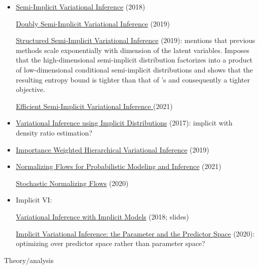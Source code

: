 \documentclass[10pt]{article}
\begin{document}
\begin{itemize}
\item
\href{https://proceedings.mlr.press/v80/yin18b/yin18b.pdf}{Semi-Implicit Variational Inference} (2018)

\href{https://proceedings.mlr.press/v89/molchanov19a/molchanov19a.pdf}{Doubly Semi-Implicit Variational Inference} (2019)

\href{https://openreview.net/pdf?id=HkxStk34Kr}{Structured Semi-Implicit Variational Inference} (2019): mentions that previous methods scale exponentially with dimension of the latent variables. Imposes that the high-dimensional semi-implicit distribution factorizes into a product of low-dimensional conditional semi-implicit distributions and shows that the resulting entropy bound is tighter than that of \sivi's and consequently a tighter \elbo objective.

\href{https://arxiv.org/pdf/2101.06070.pdf}{Efficient Semi-Implicit Variational Inference
} (2021)
\item
\href{https://arxiv.org/pdf/1702.08235.pdf}{Variational Inference using Implicit Distributions} (2017): implicit with density ratio estimation?
\item
\href{https://proceedings.neurips.cc/paper/2019/file/5737c6ec2e0716f3d8a7a5c4e0de0d9a-Paper.pdf}{Importance Weighted Hierarchical
Variational Inference} (2019)
\item
\href{https://jmlr.org/papers/volume22/19-1028/19-1028.pdf}{Normalizing Flows for Probabilistic Modeling and Inference} (2021)

\href{https://arxiv.org/pdf/2002.09547.pdf}{Stochastic Normalizing Flows} (2020)
\item
Implicit VI:

\href{https://bayesgroup.github.io/bmml_sem/2018/Molchanov_Implicit%20Models_2018_2.pdf}{Variational Inference with
Implicit Models} (2018; slides)

\href{https://arxiv.org/pdf/2010.12995.pdf}{Implicit Variational Inference: the Parameter and the Predictor Space} (2020): optimizing over predictor space rather than parameter space?
\end{itemize}
Theory/analysis
\end{document}
